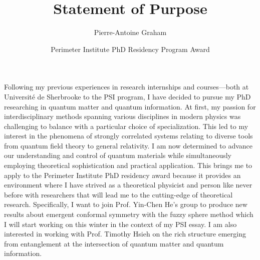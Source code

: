 \documentclass[12pt]{article}
\title{Statement of Purpose}
\author{Pierre-Antoine Graham}
\date{Perimeter Institute PhD Residency Program Award}
\begin{document}
\maketitle
\vspace{0.2cm}

Following my previous experiences in research internships and courses—both at Université de Sherbrooke to the PSI program, I have decided to pursue my PhD researching in quantum matter and quantum information. At first, my passion for interdisciplinary methods spanning various disciplines in modern physics was challenging to balance with a particular choice of specialization. This led to my interest in the phenomena of strongly correlated systems relating to diverse tools from quantum field theory to general relativity. I am now determined to advance our understanding and control of quantum materials while  simultaneously employing theoretical sophistication and practical application. This brings me to apply to the Perimeter Institute PhD residency award because it provides an environment where I have strived as a theoretical physicist and person like never before with researchers that will lead me to the cutting-edge of theoretical research. Specifically, I want to join Prof. Yin-Chen He's group to produce new results about emergent conformal symmetry with the fuzzy sphere method which I will start working on this winter in the context of my PSI essay. I am also interested in working with Prof. Timothy Hsieh on the rich structure emerging from entanglement at the intersection of quantum matter and quantum information. \\
\end{document}
